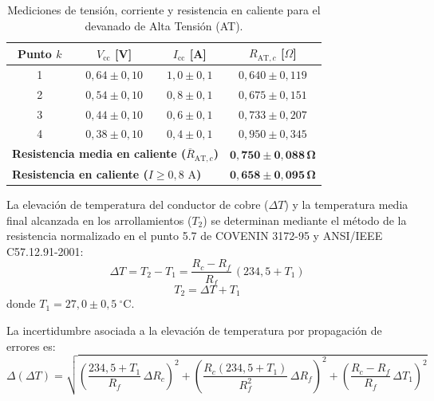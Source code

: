 \begin{table}[htbp]
    \centering
    \caption{Mediciones de tensión, corriente y resistencia en caliente para el devanado de Alta Tensión (AT).}
    \label{tab:res_cal_at}
    \begin{tabular}{c c c c}
        \toprule
        \textbf{Punto $k$} & \textbf{$V_{\text{cc}}$ [V]} & \textbf{$I_{\text{cc}}$ [A]} & \textbf{$R_{\text{AT},c}$ [$\Omega$]} \\
        \midrule
        1 & $0{,}64 \pm 0{,}10$ & $1{,}0 \pm 0{,}1$ & $0{,}640 \pm 0{,}119$ \\
        2 & $0{,}54 \pm 0{,}10$ & $0{,}8 \pm 0{,}1$ & $0{,}675 \pm 0{,}151$ \\
        3 & $0{,}44 \pm 0{,}10$ & $0{,}6 \pm 0{,}1$ & $0{,}733 \pm 0{,}207$ \\
        4 & $0{,}38 \pm 0{,}10$ & $0{,}4 \pm 0{,}1$ & $0{,}950 \pm 0{,}345$ \\
        \midrule
        \multicolumn{3}{l}{\textbf{Resistencia media en caliente ($\overline{R}_{\text{AT},c}$)}} & $\mathbf{0{,}750 \pm 0{,}088\,\Omega}$ \\
        \multicolumn{3}{l}{\textbf{Resistencia en caliente ($I \ge 0{,}8\text{ A}$)}} & $\mathbf{0{,}658 \pm 0{,}095\,\Omega}$ \\
        \bottomrule
    \end{tabular}
\end{table}

La elevación de temperatura del conductor de cobre ($\Delta T$) y la temperatura media final alcanzada en los arrollamientos ($T_2$) se determinan mediante el método de la resistencia normalizado en el punto 5.7 de COVENIN 3172-95 y ANSI/IEEE C57.12.91-2001:
\begin{equation}
    \Delta T = T_2 - T_1 = \frac{R_c - R_f}{R_f}\,(234{,}5 + T_1)
    \label{eq:delta_t_calculo}
\end{equation}
\begin{equation}
    T_2 = \Delta T + T_1
    \label{eq:t2_calculo}
\end{equation}
donde $T_1 = 27{,}0 \pm 0{,}5~^{\circ}\mathrm{C}$. 

La incertidumbre asociada a la elevación de temperatura por propagación de errores es:
\begin{equation}
    \Delta(\Delta T) = \sqrt{\left(\frac{234{,}5 + T_1}{R_f}\,\Delta R_c\right)^2 + \left(\frac{R_c(234{,}5 + T_1)}{R_f^2}\,\Delta R_f\right)^2 + \left(\frac{R_c - R_f}{R_f}\,\Delta T_1\right)^2}
    \label{eq:prop_error_dt}
\end{equation}

